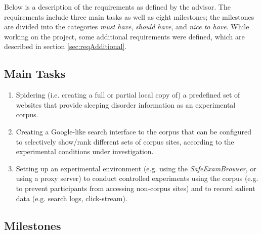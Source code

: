 \documentclass[a4paper]{usiinfbachelorproject}
\begin{document}
Below is a description of the requirements as defined by the advisor. The requirements include three main tasks as well 
as eight milestones; the milestones are divided into the categories \emph{must have}, \emph{should have}, and \emph{nice to have}.
While working on the project, some additional requirements were defined, which are described in section 
\ref{sec:reqAdditional}.

\subsection{\textbf{Main Tasks}} \label{sec:reqTasks}

    \begin{enumerate}

        \item Spidering (i.e. creating a full or partial local copy of) a predefined set of websites that provide
              sleeping disorder information as an experimental corpus. 

        \item Creating a Google-like search interface to the corpus that can be configured to selectively show/rank different sets of
              corpus sites, according to the experimental conditions under investigation.

        \item Setting up an experimental environment (e.g. using the \emph{SafeExamBrowser}, or using a proxy server) to
              conduct controlled experiments using the corpus (e.g. to prevent participants from accessing non-corpus sites)
              and to record salient data (e.g. search logs, click-stream).

    \end{enumerate} 

\subsection{\textbf{Milestones}} \label{sec:reqMilestones}
\end{document}
